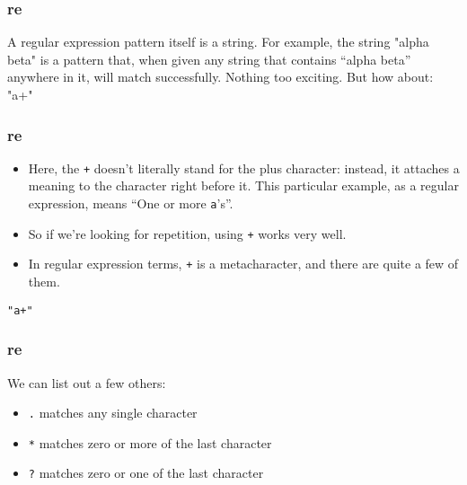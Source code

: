  \begin{frame}[fragile]
\frametitle{re}
 A
regular expression pattern itself is a string.  For example, the
string "alpha beta" is a pattern that, when given any string that contains ``alpha beta''
anywhere in it, will match successfully.  Nothing too exciting. But how about: "a+"
\end{frame}


 \begin{frame}[fragile]
\frametitle{re}
\begin{itemize}
\item Here, the \lstinline-+- doesn't literally stand for the plus character:
instead, it attaches a meaning to the character right before it.  This
particular example, as a regular expression, means ``One or more
\texttt{a}'s''.  
\item So if we're looking for repetition, using \lstinline-+-
works very well.  
\item In regular expression terms, \lstinline-+- is a
metacharacter, and there are quite a few of them. 
\end{itemize}

\begin{lstlisting}
"a+"
\end{lstlisting}
\end{frame}


 \begin{frame}[fragile]
\frametitle{re}
We can list out a
few others:
\begin{itemize}
\item \lstinline+.+ matches any single character
\item \lstinline+*+ matches zero or more of the last character
\item \lstinline+?+ matches zero or one of the last character
\end{itemize}
\end{frame}



